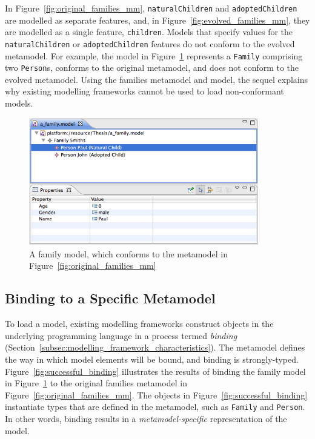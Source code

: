 In Figure~\ref{fig:original_families_mm}, \texttt{na\-tu\-r\-alCh\-il\-dr\-en} and \texttt{ad\-op\-t\-edCh\-il\-dr\-en} are modelled as separate features, and, in Figure~\ref{fig:evolved_families_mm}, they are modelled as a single feature, \texttt{ch\-il\-dr\-en}. Models that specify values for the \texttt{na\-tu\-r\-alCh\-il\-dr\-en} or \texttt{ad\-op\-t\-edCh\-il\-dr\-en} features do not conform to the evolved metamodel. For example, the model in Figure~\ref{fig:families_model} represents a \texttt{Fa\-mi\-ly} comprising two \texttt{Pe\-rs\-on}s, conforms to the original metamodel, and does not conform to the evolved metamodel. Using the families metamodel and model, the sequel explains why existing modelling frameworks cannot be used to load non-conformant models.

\begin{figure}[htbp]
  \begin{center}
    \leavevmode
    \includegraphics[width=10cm]{5.Implementation/images/family_model.png}
  \end{center}
  \caption[A family model]{A family model, which conforms to the metamodel in Figure~\ref{fig:original_families_mm}}
  \label{fig:families_model}
\end{figure}


\subsection{Binding to a Specific Metamodel}
\label{subsec:binding_specific}
To load a model, existing modelling frameworks construct objects in the underlying programming language in a process termed \emph{binding} (Section~\ref{subsec:modelling_framework_characteristics}). The metamodel defines the way in which model elements will be bound, and binding is strongly-typed. Figure~\ref{fig:successful_binding} illustrates the results of binding the family model in Figure~\ref{fig:families_model} to the original families metamodel in Figure~\ref{fig:original_families_mm}. The objects in Figure~\ref{fig:successful_binding} instantiate types that are defined in the metamodel, such as \texttt{Fa\-mi\-ly} and \texttt{Pe\-rs\-on}. In other words, binding results in a \emph{metamodel-specific} representation of the model.

